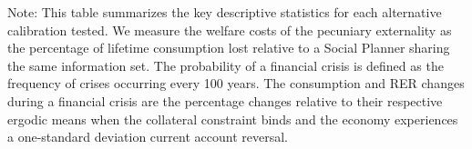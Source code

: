 \begin{landscape}
\begin{table}[]
\begin{adjustbox}{max width=1.5\textwidth}
\begin{threeparttable}
\begin{tabular}{@{}lccccccccccccccccccccccccccccc@{}}
\end{tabular}%
\begin{tablenotes} 
\footnotesize \baselineskip=14pt 
\item Note: This table summarizes the key descriptive statistics for each alternative calibration tested. We measure the welfare costs of the pecuniary externality as the percentage of lifetime consumption lost relative to a Social Planner sharing the same information set. The probability of a financial crisis is defined as the frequency of crises occurring every 100 years. The consumption and RER changes during a financial crisis are the percentage changes relative to their respective ergodic means when the collateral constraint binds and the economy experiences a one-standard deviation current account reversal. 
\end{tablenotes} 
\end{threeparttable} 
\end{adjustbox}
\end{table}
\end{landscape}
